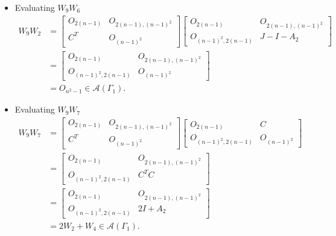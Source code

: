 \begin{itemize}
    \item Evaluating $W_9W_6$
    \begin{align*}
        W_9W_2
        &=\begin{bmatrix}
            O_{2(n-1)} & O_{2(n-1), (n-1)^2} \\
            C^T & O_{(n-1)^2}
        \end{bmatrix}\begin{bmatrix}
            O_{2(n-1)} & O_{2(n-1), (n-1)^2} \\
            O_{(n-1)^2, 2(n-1)} & J-I-A_2
        \end{bmatrix} \\
        &= \begin{bmatrix}
            O_{2(n-1)} & O_{2(n-1), (n-1)^2} \\
            O_{(n-1)^2, 2(n-1)} & O_{(n-1)^2}
        \end{bmatrix}\\
        &= O_{n^2-1}\in\mathcal{A}(\Gamma_1).
    \end{align*}
    
    \item Evaluating $W_9W_7$
    \begin{align*}
        W_9W_7
        &=\begin{bmatrix}
            O_{2(n-1)} & O_{2(n-1), (n-1)^2} \\
            C^T & O_{(n-1)^2}
        \end{bmatrix}\begin{bmatrix}
            O_{2(n-1)} &C \\
            O_{(n-1)^2, 2(n-1)} & O_{(n-1)^2}
        \end{bmatrix} \\
        &= \begin{bmatrix}
            O_{2(n-1)} & O_{2(n-1), (n-1)^2} \\
            O_{(n-1)^2, 2(n-1)} & C^TC
        \end{bmatrix}\\
        &= \begin{bmatrix}
            O_{2(n-1)} & O_{2(n-1), (n-1)^2} \\
            O_{(n-1)^2, 2(n-1)} & 2I+A_2
        \end{bmatrix}\\
        &= 2W_2 + W_4\in\mathcal{A}(\Gamma_1).
    \end{align*}
    

\end{itemize}
